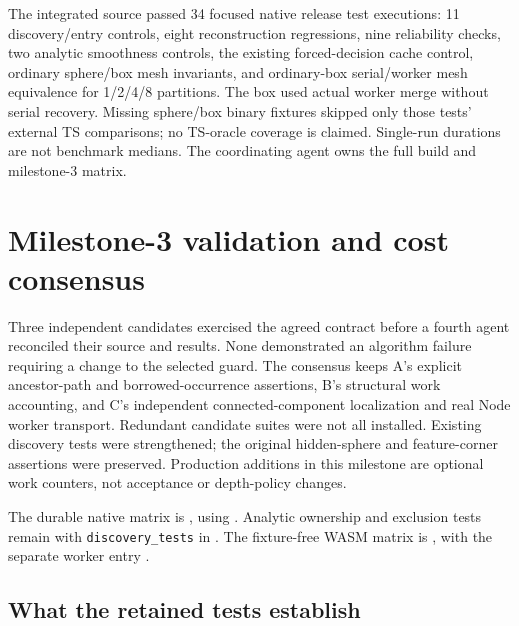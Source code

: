 \documentclass[11pt]{article}
\begin{document}
The integrated source passed 34 focused native release test executions:
11 discovery/entry controls, eight reconstruction regressions, nine reliability
checks, two analytic smoothness controls, the existing forced-decision cache
control, ordinary sphere/box mesh invariants, and ordinary-box serial/worker mesh
equivalence for 1/2/4/8 partitions. The box used actual worker merge without
serial recovery. Missing sphere/box binary fixtures skipped only those tests'
external TS comparisons; no TS-oracle coverage is claimed. Single-run durations
are not benchmark medians. The coordinating agent owns the full build and
milestone-3 matrix.

\section{Milestone-3 validation and cost consensus}
\label{sec:validation-consensus}

Three independent candidates exercised the agreed contract before a fourth
agent reconciled their source and results. None demonstrated an algorithm
failure requiring a change to the selected guard. The consensus keeps A's
explicit ancestor-path and borrowed-occurrence assertions, B's structural
work accounting, and C's independent connected-component localization and
real Node worker transport. Redundant candidate suites were not all installed.
Existing discovery tests were strengthened; the original hidden-sphere and
feature-corner assertions were preserved. Production additions in this
milestone are optional work counters, not acceptance or depth-policy changes.

The durable native matrix is
, using
. Analytic ownership and
exclusion tests remain with \texttt{discovery\_tests} in
. The fixture-free WASM
matrix is , with the separate
worker entry .

\subsection{What the retained tests establish}
\end{document}

